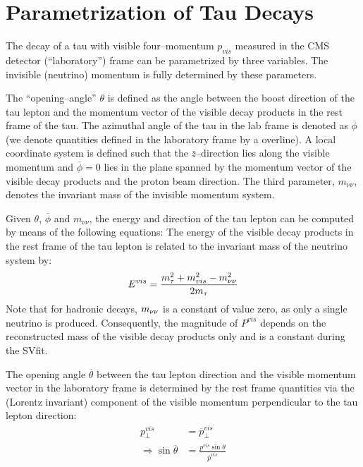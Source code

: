 \section{Parametrization of Tau Decays}
\label{sec:svParameterization}

The decay of a tau with visible four--momentum $p_{vis}$ measured in the CMS
detector (``laboratory'') frame can be parametrized by three variables.  The
invisible (neutrino) momentum is fully determined by these parameters.

The ``opening--angle'' $\theta$ is defined as the angle between the boost
direction of the tau lepton and the momentum vector of the visible decay
products in the rest frame of the tau.  The azimuthal angle of the tau in the
lab frame is denoted as $\overline{\phi}$ (we denote quantities defined in the
laboratory frame by a overline).  A local coordinate system is defined such that the
$\bar{z}$--direction lies along the visible momentum and $\overline{\phi} = 0$ lies
in the plane spanned by the momentum vector of the visible decay products and
the proton beam direction. The third parameter, $m_{\nu\nu}$, denotes the
invariant mass of the invisible momentum system.

Given $\theta$, $\overline{\phi}$ and $m_{\nu\nu}$, the energy and direction of the
tau lepton can be computed by means of the following equations: The energy of
the visible decay products in the rest frame of the tau lepton is related to the
invariant mass of the neutrino system by:
\begin{equation}
E^{vis} = \frac{m_\tau^2 + m_{vis}^2 - m_{\nu\nu}^2}{2m_\tau} 
\label{eq:restFrameMomentumRelation}
\end{equation}
Note that for hadronic decays, $m_{\nu\nu}$ is a constant of value zero, as only a
single neutrino is produced.  Consequently, the magnitude of $P^{vis}$ depends
on the reconstructed mass of the visible decay products only and is a constant
during the SVfit.

The opening angle $\overline{\theta}$ between the tau lepton direction and the
visible momentum vector in the laboratory frame is determined by the rest frame
quantities via the (Lorentz invariant) component of the visible momentum
perpendicular to the tau lepton direction:
\begin{align}
p^{vis}_{\perp} &= \overline p^{vis}_{\perp} \nonumber \\
\Rightarrow \sin \overline \theta &= \frac{p^{vis} \sin \theta}{\overline p^{vis}} 
\label{eq:labFrameOpeningAngle} 
\end{align}

